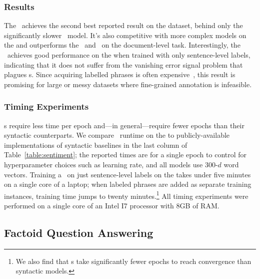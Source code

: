 \subsubsection{Results}

The \dan\ achieves the second best reported result on the  dataset,
behind only the significantly slower \cnnmc\ model. It's also competitive with more complex models on the  and outperforms
 the \dcnn\ and \wrrbm\ on the document-level 
task. Interestingly, the \dan\ achieves good performance on the  when
trained with only sentence-level labels, indicating that it does not suffer from
the vanishing error signal problem that plagues \recnn s. Since acquiring
labelled phrases is often expensive~\cite{sayeed-12,IyyerEtAl2014}, this result
is promising for large or messy datasets where fine-grained annotation is
infeasible.

\subsubsection{Timing Experiments}

\dan s require less time per epoch and---in general---require fewer epochs than
their syntactic counterparts. We compare \dan\ runtime on the  to
publicly-available implementations of syntactic baselines in the last column of
Table~\ref{table:sentiment}; the reported times are for a single epoch to
control for hyperparameter choices such as learning rate, and all models use
300-$d$ word vectors. Training a \dan\ on just sentence-level labels on the
 takes under five minutes on a single core of a laptop; when labeled
phrases are added as separate training instances, training time jumps to twenty
minutes.\footnote{We also find that \dan s take significantly fewer epochs to
  reach convergence than syntactic models.} All timing experiments were performed on a
single core of an Intel I7 processor with 8GB of RAM.



\subsection{Factoid Question Answering}


